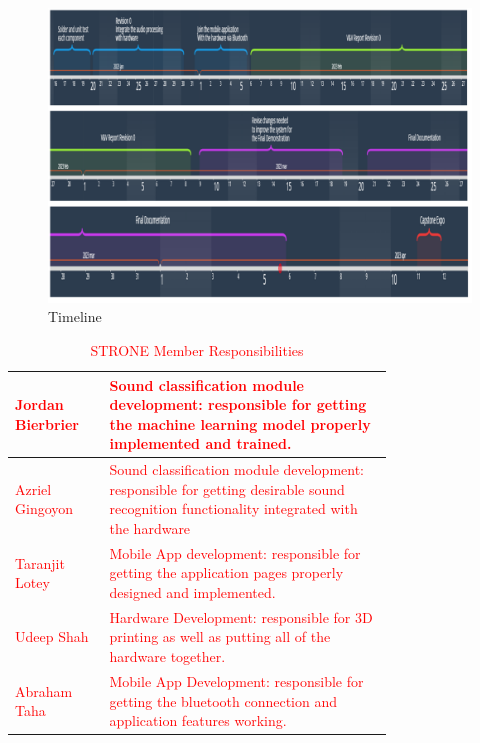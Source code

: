 \documentclass[12pt, titlepage]{article}
\begin{document}
\begin{figure}[H]
  \includegraphics[clip,width=\textwidth,height=\textheight,keepaspectratio]{Timeline2.pdf}
  \caption{Timeline}
  \label{Timeline} 
\end{figure}

\begin{center}
\begin{table}[H]
  \centering
  \begin{tabular}{|l|p{0.75\linewidth}|}
  \hline
  \textcolor{red}{Jordan Bierbrier} & \textcolor{red}{Sound classification module development: responsible for getting the machine learning model properly implemented and trained.}  \\
  \hline
  \textcolor{red}{Azriel Gingoyon} & \textcolor{red}{Sound classification module development: responsible for getting desirable sound recognition functionality integrated with the hardware}  \\
  \hline
  \textcolor{red}{Taranjit Lotey} & \textcolor{red}{Mobile App development: responsible for getting the application pages properly designed and implemented.}  \\
  \hline
  \textcolor{red}{Udeep Shah} & \textcolor{red}{Hardware Development: responsible for 3D printing as well as putting all of the hardware together.}  \\
  \hline
  \textcolor{red}{Abraham Taha} & \textcolor{red}{Mobile App Development: responsible for getting the bluetooth connection and application features working.}  \\
  \hline
  \end{tabular}
  \caption{\textcolor{red}{STRONE Member Responsibilities}}
\end{table}
\end{center}
\end{document}
